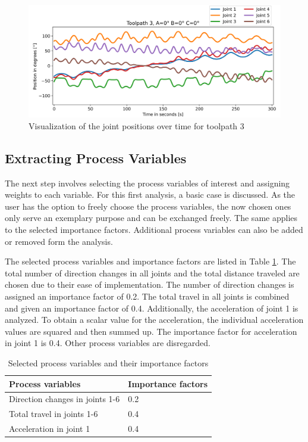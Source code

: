 \begin{figure}[H]
	\centerline{\includegraphics[width=1\textwidth]{figures/TP3ABC0.png}}
	\caption{Visualization of the joint positions over time for toolpath 3}
	\label{TP3ABC0}
\end{figure}

\subsection{Extracting Process Variables}
The next step involves selecting the process variables of interest and assigning weights to each variable. For this first analysis, a basic case is discussed. As the user has the option to freely choose the process variables, the now chosen ones only serve an exemplary purpose and can be exchanged freely. The same applies to the selected importance factors. Additional process variables can also be added or removed form the analysis. 

The selected process variables and importance factors are listed in Table \ref{PPbasic}. The total number of direction changes in all joints and the total distance traveled are chosen due to their ease of implementation. The number of direction changes is assigned an importance factor of 0.2.
The total travel in all joints is combined and given an importance factor of 0.4.
Additionally, the acceleration of joint 1 is analyzed. To obtain a scalar value for the acceleration, the individual acceleration values are squared and then summed up. The importance factor for acceleration in joint 1 is 0.4. Other process variables are disregarded.

\begin{table}[H]
	\centering
	\caption{Selected process variables and their importance factors}
	\begin{tabular}{||l|l||}
		Process variables& Importance factors \\
		\hline
		\hline
		\hline
		Direction changes in joints 1-6	&		0.2 \\
		Total travel in joints 1-6	&  	0.4 \\
		Acceleration in joint 1	& 		0.4\\
		
		\hline
		\hline
	\end{tabular}
	
	
	\label{PPbasic}
\end{table}


